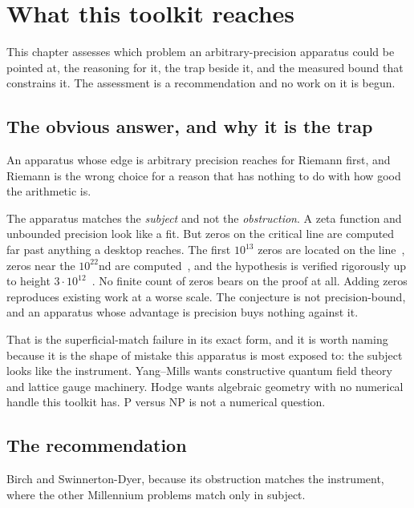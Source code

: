\chapter{What this toolkit reaches}

This chapter assesses which problem an arbitrary-precision apparatus could be pointed at, the
reasoning for it, the trap beside it, and the measured bound that constrains it. The assessment is a
recommendation and no work on it is begun.

\section{The obvious answer, and why it is the trap}

An apparatus whose edge is arbitrary precision reaches for Riemann first, and Riemann is the wrong
choice for a reason that has nothing to do with how good the arithmetic is.

The apparatus matches the \emph{subject} and not the \emph{obstruction}. A zeta function and
unbounded precision look like a fit. But zeros on the critical line are computed far past anything a
desktop reaches. The first $10^{13}$ zeros are located on the line~\cite{src:Gourdon-2004}, zeros
near the $10^{22}$nd are computed~\cite{src:Odlyzko-2001}, and the hypothesis is verified rigorously
up to height $3\cdot10^{12}$~\cite{src:Platt-and-Trudgian-2021}. No finite count of zeros bears on
the proof at all. Adding zeros reproduces existing work at a worse scale. The conjecture is not
precision-bound, and an apparatus whose advantage is precision buys nothing against it.

That is the superficial-match failure in its exact form, and it is worth naming because it is the
shape of mistake this apparatus is most exposed to: the subject looks like the instrument.
Yang--Mills wants constructive quantum field theory and lattice gauge machinery. Hodge wants
algebraic geometry with no numerical handle this toolkit has. P versus NP is not a numerical
question.

\section{The recommendation}

Birch and Swinnerton-Dyer, because its obstruction matches the instrument, where the other
Millennium problems match only in subject.


